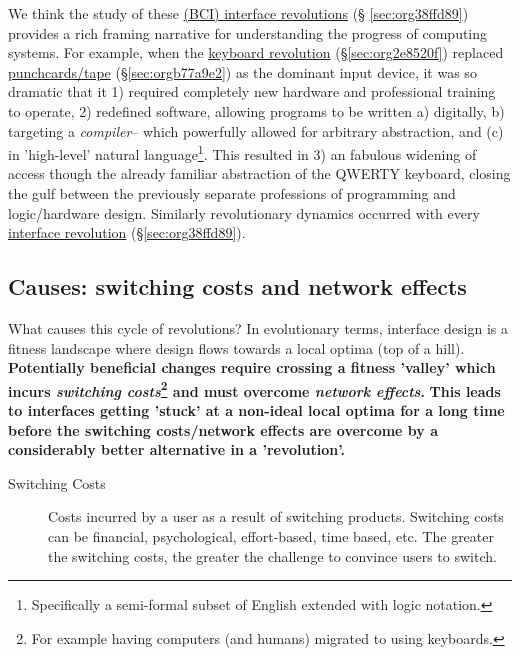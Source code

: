 \documentclass[logo,bsc,singlespacing,parskip]{infthesis}
\begin{document}
We think the study of these \hyperref[sec:org38ffd89]{(BCI) interface revolutions} (§  \ref{sec:org38ffd89}) provides a rich framing narrative for understanding the progress of computing systems.
For example, when the \hyperref[sec:org2e8520f]{keyboard revolution} (\S \ref{sec:org2e8520f}) replaced  \hyperref[sec:orgb77a9e2]{punchcards/tape} (\S \ref{sec:orgb77a9e2}) as the dominant input device, it was so dramatic that it 1) required completely new hardware and professional training to operate, 2) redefined software, allowing programs to be written a) digitally, b) targeting a \emph{compiler}-- which powerfully allowed for arbitrary abstraction, and (c) in 'high-level' natural language\footnote{Specifically a semi-formal subset of English extended with logic notation.}. This resulted in 3) an fabulous widening of access though the already familiar abstraction of the QWERTY keyboard, closing the gulf between the previously separate professions of programming and logic/hardware design.
Similarly revolutionary dynamics occurred with every \hyperref[sec:org38ffd89]{interface revolution} (\S \ref{sec:org38ffd89}).
\subsection{Causes: switching costs and network effects}
\label{sec:org925ba72}
What causes this cycle of revolutions?
In evolutionary terms, interface design is a fitness landscape where design flows towards a local optima (top of a hill).
\textbf{Potentially beneficial changes require crossing a fitness 'valley' which incurs \emph{switching costs}\footnote{For example having computers (and humans) migrated to using keyboards.} and must overcome \emph{network effects}.}
\textbf{This leads to interfaces getting 'stuck' at a non-ideal local optima for a long time before the switching costs/network effects are overcome by a considerably better alternative in a 'revolution'.}

\begin{mdframed}
\begin{description}
\item[{Switching Costs\label{switching costs}}] Costs incurred by a user as a result of switching products.
Switching costs can be financial, psychological, effort-based, time based, etc.
The greater the switching costs, the greater the challenge to convince users to switch.
\end{description}
\end{mdframed}
\end{document}
